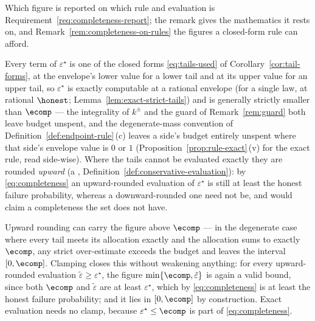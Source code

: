 
Which figure is reported on which rule and evaluation is
Requirement~\ref{req:completeness-report}; the remark gives the mathematics
it rests on, and Remark~\ref{rem:completeness-on-rules} the figures a
closed-form rule can afford.

\begin{remark}
\label{rem:epsstar}
Every term of $\varepsilon^{\star}$ is one of the closed forms
\eqref{eq:tails-used} of Corollary~\ref{cor:tail-forms}, at the envelope's
lower value for a lower tail and at its upper value for an upper tail, so
$\varepsilon^{\star}$ is exactly computable at a rational envelope (for a
single law, at rational $\honest$; Lemma~\ref{lem:exact-strict-tails}) and is
generally strictly smaller than
$\ecomp$ --- the integrality of $k^{\pm}$ and the guard of
Remark~\ref{rem:guard} both leave budget unspent, and the degenerate-mass
convention of Definition~\ref{def:endpoint-rule}\,(c) leaves a side's budget
entirely unspent where that side's envelope value is $0$ or $1$
(Proposition~\ref{prop:rule-exact}\,(v) for the exact rule, read side-wise).
Where the tails cannot be evaluated exactly they are rounded \emph{upward}
(a ,
Definition~\ref{def:conservative-evaluation}): by \eqref{eq:completeness} an upward-rounded
evaluation of $\varepsilon^{\star}$ is still at least the honest failure
probability, whereas a downward-rounded one need not be, and would claim a
completeness the set does not have.

Upward rounding can carry the figure above $\ecomp$ --- in the degenerate
case where every tail meets its allocation exactly and the allocation sums to
exactly $\ecomp$, any strict over-estimate exceeds the budget and leaves the
interval $[0,\ecomp]$. Clamping closes this without weakening anything: for
every upward-rounded evaluation $\tilde\varepsilon\ge\varepsilon^{\star}$,
the figure $\min\{\ecomp,\tilde\varepsilon\}$ is again a valid bound, since
both $\ecomp$ and $\tilde\varepsilon$ are at least $\varepsilon^{\star}$,
which by \eqref{eq:completeness} is at least the honest failure probability;
and it lies in $[0,\ecomp]$ by construction. Exact evaluation needs no clamp,
because $\varepsilon^{\star}\le\ecomp$ is part of \eqref{eq:completeness}.
\end{remark}
